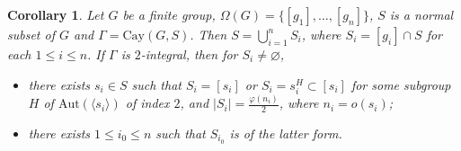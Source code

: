 \documentclass[12pt,a4paper]{article}
\newtheorem{lem}[thm]{Lemma}
\newtheorem{core}[thm]{Corollary}
\def \leq {\leqslant}
\begin{document}
	\begin{core}\label{asli}
		Let $G$ be a finite group, $\Omega(G)=\{[g_1],\ldots,[g_n]\}$, $S$ is a normal subset of $G$ and $\Gamma=\mathrm{Cay}(G,S)$.
		Then $S=\bigcup_{i=1}^{n}S_i$, where $S_i=[g_i]\cap S$ for each $1\leq i\leq n$.
		If $\Gamma$ is $2$-integral, then for $S_i\neq \varnothing$,
		\begin{itemize}
			\item [$(1)$]  there exists $s_i\in S$ such that $S_i=[s_i]$ or $S_i=s_i^H\subset [s_i]$ for some subgroup $H$ of $\mathrm{Aut}(\langle s_i\rangle)$ of index $2$, and $|S_i|=\frac{\varphi(n_i)}{2}$, where $n_i=o(s_i)$;
			\item[$(2)$] there exists $1\leq i_0\leq n$ such that $S_{i_0}$ is of the latter form. 
		\end{itemize}
	\end{core}
\end{document}
